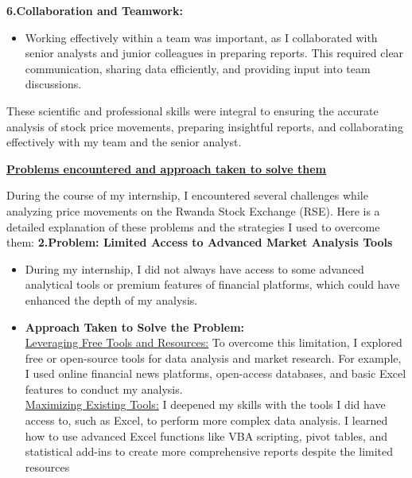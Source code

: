 \documentclass{article}
\begin{document}
\begin{titlepage}
\begin{titlepage}
\begin{flushleft}
\begin{flushleft}
\vspace{0.4cm}

\textbf{6.Collaboration and Teamwork:}

\begin{itemize}

\item Working effectively within a team was important, as I collaborated with senior analysts and junior colleagues in preparing reports. This required clear communication, sharing data efficiently, and providing input into team discussions.

\end{itemize}
\vspace{0.7cm}

These scientific and professional skills were integral to ensuring the accurate analysis of stock price movements, preparing insightful reports, and collaborating effectively with my team and the senior analyst.
\vspace{1cm}



\Large{\textbf{\underline{Problems encountered and approach taken to solve them }}}
\vspace{0.2cm}

During the course of my internship, I encountered several challenges while analyzing price movements on the Rwanda Stock Exchange (RSE). Here is a detailed explanation of these problems and the strategies I used to overcome them:
\vspace{0.3cm}
\textbf{2.Problem: Limited Access to Advanced Market Analysis Tools}
\begin{itemize}
    \item During my internship, I did not always have access to some advanced analytical tools or premium features of financial platforms, which could have enhanced the depth of my analysis.
    \item \textbf{Approach Taken to Solve the Problem:}\\
    
    \underline{Leveraging Free Tools and Resources:}
To overcome this limitation, I explored free or open-source tools for data analysis and market research. For example, I used online financial news platforms, open-access databases, and basic Excel features to conduct my analysis. 
\\

\underline{Maximizing Existing Tools:}
I deepened my skills with the tools I did have access to, such as Excel, to perform more complex data analysis. I learned how to use advanced Excel functions like VBA scripting, pivot tables, and statistical add-ins to create more comprehensive reports despite the limited resources
\end{itemize}
\vspace{0.4cm}


\end{flushleft}
\end{flushleft}
\end{titlepage}
\end{titlepage}
\end{document}
